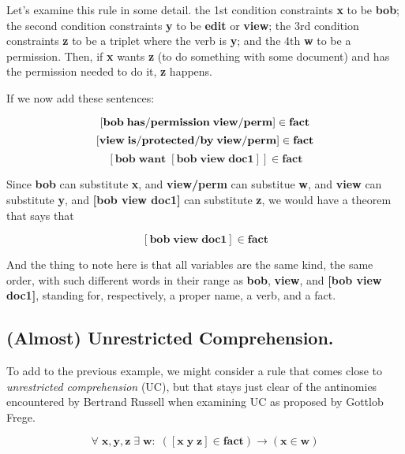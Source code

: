 \documentclass{IOS-Book-Article}     %
\begin{document}
Let's examine this rule in some detail.
the 1st condition constraints \textbf{x} to be \textbf{bob};
the second condition constraints \textbf{y} to be \textbf{edit} or \textbf{view};
the  3rd condition constraints \textbf{z} to be a triplet where the verb is \textbf{y};
and the 4th \textbf{w} to be a  permission.
Then, if \textbf{x} wants \textbf{z} (to do something with some document)
and has the permission needed to do it,
\textbf{z} happens.

If we now  add these sentences:

\begin{equation}
  \mathbf{\left[bob\; has\-/permission\; view\-/perm\right] \in  fact}
\end{equation}
\begin{equation}
  \mathbf{\left[view\; is\-/protected\-/by\; view\-/perm\right] \in fact}
\end{equation}
\begin{equation}
  \mathbf{\left[bob\; want\; \left[bob\; view\; doc1\right]\right] \in fact}
\end{equation}

Since \textbf{bob} can substitute \textbf{x},
and \textbf{view\-/perm} can substitue \textbf{w},
and \textbf{view} can substitute \textbf{y},
and \textbf{[bob view doc1]} can substitute \textbf{z},
we would have a  theorem that says that

\begin{equation}
  \mathbf{\left[bob\; view\; doc1\right] \in fact}
\end{equation}

And the thing to note here is that all variables are
the same  kind, the same order, with  such different words in their range as
\textbf{bob}, \textbf{view}, and \textbf{[bob view doc1]},
standing for, respectively, a proper name, a verb, and a fact.

\subsection{(Almost) Unrestricted Comprehension.}

To add to the previous example, we might consider a rule that comes close to
\textit{unrestricted comprehension} (UC), but that stays just clear of
the antinomies encountered by  Bertrand Russell when examining UC
as proposed by Gottlob Frege.

\begin{equation}
  \forall\;\mathbf{x}\mathrm{,}\mathbf{y}\mathrm{,}\mathbf{z}\;\exists\;\mathbf{w}\mathrm{:} \;\mathbf{\left(\left[x\; y\; z\right] \in fact\right)} \rightarrow \mathbf{\left(x \in w\right)}
\end{equation}
\end{document}
